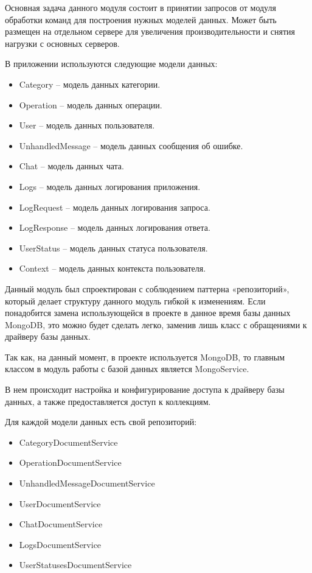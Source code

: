 Основная задача данного модуля состоит в принятии запросов от модуля
обработки команд для построения нужных моделей данных. Может быть
размещен на отдельном сервере для увеличения производительности и снятия нагрузки с основных серверов.

В приложении используются следующие модели данных:

\begin{itemize}
	\item Category – модель данных категории.
	\item Operation – модель данных операции.
	\item User – модель данных пользователя.
	\item UnhandledMessage – модель данных сообщения об ошибке.
	\item Chat – модель данных чата.
	\item Logs – модель данных логирования приложения.
	\item LogRequest – модель данных логирования запроса.
	\item LogResponse – модель данных логирования ответа.
	\item UserStatus – модель данных статуса пользователя.
	\item Context – модель данных контекста пользователя.
\end{itemize}

Данный модуль был спроектирован с соблюдением паттерна «репозиторий», который делает структуру данного модуль гибкой к изменениям. Если понадобится замена использующейся в проекте в данное время базы данных MongoDB, это можно будет сделать легко, заменив лишь класс с обращениями к драйверу базы данных.

Так как, на данный момент, в проекте используется MongoDB, то главным классом в модуль работы с базой данных является MongoService.

В нем происходит настройка и конфигурирование доступа к драйверу базы данных, а также предоставляется доступ к коллекциям.

Для каждой модели данных есть свой репозиторий:

\begin{itemize}
	\item CategoryDocumentService
	\item OperationDocumentService
	\item UnhandledMessageDocumentService
	\item UserDocumentService
	\item ChatDocumentService
	\item LogsDocumentService
	\item UserStatusesDocumentService
\end{itemize}

